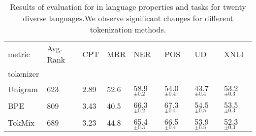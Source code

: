 \begin{table}
\centering
\caption{Results of evaluation for in language properties and tasks for twenty diverse languages.We observe significant changes for different tokenization methods.}
\label{tab:in_lang_avg_20l}
    \small
    \begin{tabular}{llllllll}
    \toprule
    metric & Avg. Rank &   CPT &   MRR &               NER &               POS &                UD &              XNLI \\
    tokenizer &           &       &       &                   &                   &                   &                   \\
    \midrule
    Unigram   &       623 &  2.89 &  52.6 &  58.9 $_{\pm0.2}$ &  54.0 $_{\pm0.4}$ &  43.7 $_{\pm0.4}$ &  53.2 $_{\pm0.3}$ \\
    BPE       &       809 &  3.43 &  40.5 &  66.3 $_{\pm0.2}$ &  67.3 $_{\pm0.4}$ &  54.5 $_{\pm0.5}$ &  53.5 $_{\pm0.3}$ \\
    TokMix    &       689 &  3.23 &  44.8 &  65.4 $_{\pm0.3}$ &  66.5 $_{\pm0.4}$ &  53.9 $_{\pm0.5}$ &  52.3 $_{\pm0.3}$ \\
    \bottomrule
    \end{tabular}
    \end{table}
    